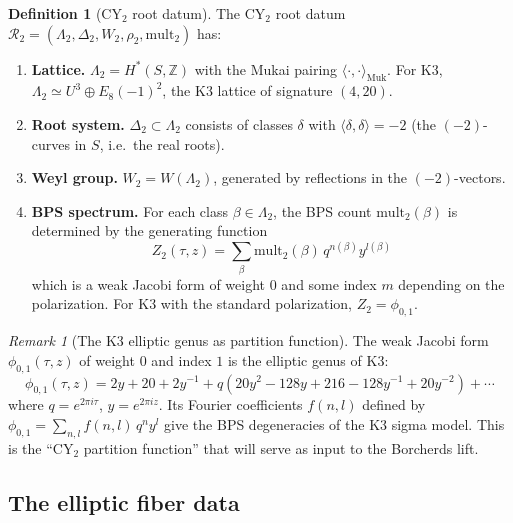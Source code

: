 \documentclass[11pt]{article}
\theoremstyle{plain}
\theoremstyle{definition}
\newtheorem{definition}[theorem]{Definition}
\theoremstyle{remark}
\newtheorem{remark}[theorem]{Remark}
\newcommand{\CY}{\mathrm{CY}}
\newcommand{\cR}{\mathcal{R}}
\begin{document}
\begin{definition}[$\CY_2$ root datum]
\label{def:cy2-root-datum}
The $\CY_2$ root datum $\cR_2 = (\Lambda_2, \Delta_2, W_2, \rho_2, \mathrm{mult}_2)$ has:
\begin{enumerate}[label=(\roman*)]
\item \textbf{Lattice.} $\Lambda_2 = H^*(S, \mathbb{Z})$ with the Mukai
 pairing $\langle \cdot, \cdot \rangle_{\mathrm{Muk}}$. For K3,
 $\Lambda_2 \simeq U^3 \oplus E_8(-1)^2$, the K3 lattice of signature
 $(4, 20)$.

\item \textbf{Root system.} $\Delta_2 \subset \Lambda_2$ consists of classes
 $\delta$ with $\langle \delta, \delta \rangle = -2$ (the $(-2)$-curves in
 $S$, i.e.\ the real roots).

\item \textbf{Weyl group.} $W_2 = W(\Lambda_2)$, generated by reflections in
 the $(-2)$-vectors.

\item \textbf{BPS spectrum.} For each class $\beta \in \Lambda_2$, the BPS
 count $\mathrm{mult}_2(\beta)$ is determined by the generating function
 \begin{equation}\label{eq:cy2-partition}
 Z_2(\tau, z) = \sum_{\beta} \mathrm{mult}_2(\beta) \, q^{n(\beta)} y^{l(\beta)}
 \end{equation}
 which is a weak Jacobi form of weight $0$ and some index $m$ depending on the
 polarization. For K3 with the standard polarization, $Z_2 = \phi_{0,1}$.
\end{enumerate}
\end{definition}

\begin{remark}[The K3 elliptic genus as partition function]
\label{rmk:k3-ell-genus}
The weak Jacobi form $\phi_{0,1}(\tau, z)$ of weight $0$ and index $1$ is the
elliptic genus of K3:
\[
 \phi_{0,1}(\tau, z)
 = 2y + 20 + 2y^{-1} + q(20y^2 - 128y + 216 - 128y^{-1} + 20y^{-2}) + \cdots
\]
where $q = e^{2\pi i \tau}$, $y = e^{2\pi i z}$. Its Fourier coefficients
$f(n, l)$ defined by $\phi_{0,1} = \sum_{n,l} f(n,l) \, q^n y^l$ give the BPS
degeneracies of the K3 sigma model. This is the ``$\CY_2$ partition function''
that will serve as input to the Borcherds lift.
\end{remark}

\subsection{The elliptic fiber data}
\label{subsec:elliptic-fiber}
\end{document}
